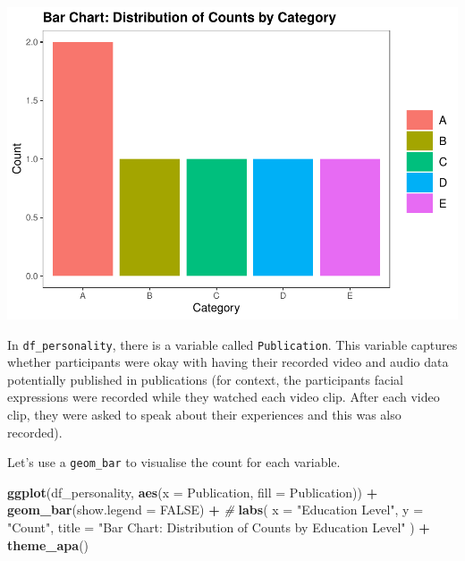 \documentclass[
]{book}
\newenvironment{Shaded}{\begin{snugshade}}{\end{snugshade}}
\newcommand{\AttributeTok}[1]{\textcolor[rgb]{0.13,0.29,0.53}{#1}}
\newcommand{\CommentTok}[1]{\textcolor[rgb]{0.56,0.35,0.01}{\textit{#1}}}
\newcommand{\ConstantTok}[1]{\textcolor[rgb]{0.56,0.35,0.01}{#1}}
\newcommand{\FunctionTok}[1]{\textcolor[rgb]{0.13,0.29,0.53}{\textbf{#1}}}
\newcommand{\NormalTok}[1]{#1}
\newcommand{\SpecialCharTok}[1]{\textcolor[rgb]{0.81,0.36,0.00}{\textbf{#1}}}
\newcommand{\StringTok}[1]{\textcolor[rgb]{0.31,0.60,0.02}{#1}}
\begin{document}
\includegraphics{rintro_demo_files/figure-latex/unnamed-chunk-323-1.pdf}

In \texttt{df\_personality}, there is a variable called \texttt{Publication}. This variable captures whether participants were okay with having their recorded video and audio data potentially published in publications (for context, the participants facial expressions were recorded while they watched each video clip. After each video clip, they were asked to speak about their experiences and this was also recorded).

Let's use a \texttt{geom\_bar} to visualise the count for each variable.

\begin{Shaded}
\begin{Highlighting}[]
\FunctionTok{ggplot}\NormalTok{(df\_personality, }\FunctionTok{aes}\NormalTok{(}\AttributeTok{x =}\NormalTok{ Publication, }\AttributeTok{fill =}\NormalTok{ Publication)) }\SpecialCharTok{+}
  \FunctionTok{geom\_bar}\NormalTok{(}\AttributeTok{show.legend =} \ConstantTok{FALSE}\NormalTok{) }\SpecialCharTok{+} \CommentTok{\#}
  \FunctionTok{labs}\NormalTok{(}
    \AttributeTok{x =} \StringTok{"Education Level"}\NormalTok{,}
    \AttributeTok{y =} \StringTok{"Count"}\NormalTok{,}
    \AttributeTok{title =} \StringTok{"Bar Chart: Distribution of Counts by Education Level"}
\NormalTok{  ) }\SpecialCharTok{+}
  \FunctionTok{theme\_apa}\NormalTok{()}
\end{Highlighting}
\end{Shaded}
\end{document}
